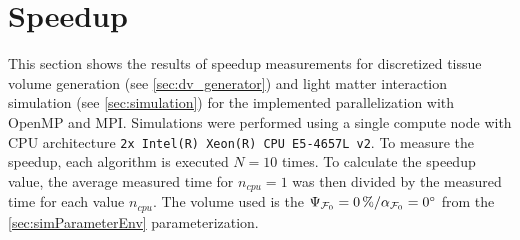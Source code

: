 \section{Speedup}
\label{sec:simSpeedup}
%
This section shows the results of speedup measurements for discretized tissue volume generation (see \cref{sec:dv_generator}) and light matter interaction simulation (see \cref{sec:simulation}) for the implemented parallelization with \ac{OpenMP} and \ac{MPI}.
Simulations were performed using a single compute node with \ac{CPU} architecture \texttt{2x Intel(R) Xeon(R) CPU E5-4657L v2}.
To measure the speedup, each algorithm is executed $N=10$ times.
To calculate the speedup value, the average measured time for $n_\mathit{cpu}=1$ was then divided by the measured time for each value $n_\mathit{cpu}$.
The volume used is the $\textnormal{$\Psi_{\textnormal{$\mathcal{F}_0$}}$}=\SI{0}{\percent} / \textnormal{$\alpha_{\textnormal{$\mathcal{F}_0$}}$}=\SI{0}{\degree}$ from the \cref{sec:simParameterEnv} parameterization.
% 
% 
% 
